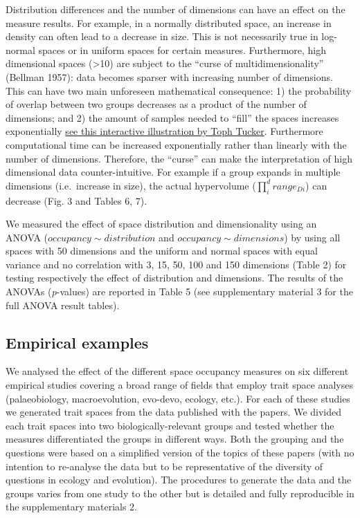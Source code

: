\documentclass[]{article}
\begin{document}
Distribution differences and the number of dimensions can have an effect
on the measure results. For example, in a normally distributed space, an
increase in density can often lead to a decrease in size. This is not
necessarily true in log-normal spaces or in uniform spaces for certain
measures. Furthermore, high dimensional spaces (\textgreater{}10) are
subject to the ``curse of multidimensionality'' (Bellman 1957): data
becomes sparser with increasing number of dimensions. This can have two
main unforeseen mathematical consequence: 1) the probability of overlap
between two groups decreases as a product of the number of dimensions;
and 2) the amount of samples needed to ``fill'' the spaces increases
exponentially
\href{https://observablehq.com/@tophtucker/theres-plenty-of-room-in-the-corners}{see
this interactive illustration by Toph Tucker}. Furthermore computational
time can be increased exponentially rather than linearly with the number
of dimensions. Therefore, the ``curse'' can make the interpretation of
high dimensional data counter-intuitive. For example if a group expands
in multiple dimensions (i.e.~increase in size), the actual hypervolume
(\(\prod_{i}^{d} range_{Di}\)) can decrease (Fig. 3 and Tables 6, 7).

We measured the effect of space distribution and dimensionality using an
ANOVA (\(occupancy \sim distribution\) and
\(occupancy \sim dimensions\)) by using all spaces with 50 dimensions
and the uniform and normal spaces with equal variance and no correlation
with 3, 15, 50, 100 and 150 dimensions (Table 2) for testing
respectively the effect of distribution and dimensions. The results of
the ANOVAs (\emph{p}-values) are reported in Table 5 (see supplementary
material 3 for the full ANOVA result tables).

\subsection{Empirical examples}\label{empirical-examples}

We analysed the effect of the different space occupancy measures on six
different empirical studies covering a broad range of fields that employ
trait space analyses (palaeobiology, macroevolution, evo-devo, ecology,
etc.). For each of these studies we generated trait spaces from the data
published with the papers. We divided each trait spaces into two
biologically-relevant groups and tested whether the measures
differentiated the groups in different ways. Both the grouping and the
questions were based on a simplified version of the topics of these
papers (with no intention to re-analyse the data but to be
representative of the diversity of questions in ecology and evolution).
The procedures to generate the data and the groups varies from one study
to the other but is detailed and fully reproducible in the supplementary
materials 2.
\end{document}

